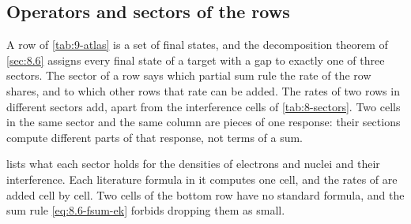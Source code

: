 \subsection{Operators and sectors of the rows}\label{sec:9.1-sectors}

A row of \cref{tab:9-atlas} is a set of final states, and the decomposition theorem of \cref{sec:8.6} assigns every final state of a target with a gap to exactly one of three sectors. The sector of a row says which partial sum rule the rate of the row shares, and to which other rows that rate can be added. The rates of two rows in different sectors add, apart from the interference cells of \cref{tab:8-sectors}. Two cells in the same sector and the same column are pieces of one response: their sections compute different parts of that response, not terms of a sum.

 lists what each sector holds for the densities of electrons and nuclei and their interference. Each literature formula in it computes one cell, and the rates of  are added cell by cell. Two cells of the bottom row have no standard formula, and the sum rule \cref{eq:8.6-fsum-ek} forbids dropping them as small.

